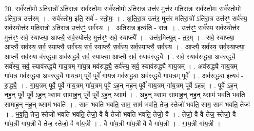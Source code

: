 \documentclass[17pt]{extarticle}
\begin{document}
20. सर्व॑स्तोमो ऽतिरा॒त्रो॑ ऽतिरा॒त्रः सर्व॑स्तोमः॒ सर्व॑स्तोमो ऽतिरा॒त्र उत्त॑र॒ मुत्त॑र मतिरा॒त्रः सर्व॑स्तोमः॒ सर्व॑स्तोमो ऽतिरा॒त्र उत्त॑रम् । . सर्व॑स्तोम॒ इति॒ सर्व॑ - स्तो॒मः॒ । . अ॒ति॒रा॒त्र उत्त॑र॒ मुत्त॑र मतिरा॒त्रो॑ ऽतिरा॒त्र उत्त॑रꣳ॒॒ सर्व॑स्य॒ सर्व॒स्योत्त॑र मतिरा॒त्रो॑ ऽतिरा॒त्र उत्त॑रꣳ॒॒ सर्व॑स्य । . अ॒ति॒रा॒त्र इत्य॑ति - रा॒त्रः । . उत्त॑रꣳ॒॒ सर्व॑स्य॒ सर्व॒स्योत्त॑र॒ मुत्त॑रꣳ॒॒ सर्व॒ स्याप्त्या॒ आप्त्यै॒ सर्व॒स्योत्त॑र॒ मुत्त॑रꣳ॒॒ सर्व॒ स्याप्त्यै᳚ । . उत्त॑र॒मित्युत् - त॒र॒म् । . सर्व॒ स्याप्त्या॒ आप्त्यै॒ सर्व॑स्य॒ सर्व॒ स्याप्त्यै॒ सर्व॑स्य॒ सर्व॒ स्याप्त्यै॒ सर्व॑स्य॒ सर्व॒स्याप्त्यै॒ सर्व॑स्य । . आप्त्यै॒ सर्व॑स्य॒ सर्व॒स्याप्त्या॒ आप्त्यै॒ सर्व॒स्या व॑रुद्ध्या॒ अव॑रुद्ध्यै॒ सर्व॒ स्याप्त्या॒ आप्त्यै॒ सर्व॒ स्याव॑रुद्ध्यै । . सर्व॒ स्याव॑रुद्ध्या॒ अव॑रुद्ध्यै॒ सर्व॑स्य॒ सर्व॒ स्याव॑रुद्ध्यै गाय॒त्रम् गा॑य॒त्र मव॑रुद्ध्यै॒ सर्व॑स्य॒ सर्व॒ स्याव॑रुद्ध्यै गाय॒त्रम् । . अव॑रुद्ध्यै गाय॒त्रम् गा॑य॒त्र मव॑रुद्ध्या॒ अव॑रुद्ध्यै गाय॒त्रम् पूर्वे॒ पूर्वे॑ गाय॒त्र मव॑रुद्ध्या॒ अव॑रुद्ध्यै गाय॒त्रम् पूर्वे᳚ । . अव॑रुद्ध्या॒ इत्यव॑ - रु॒द्ध्यै॒ । . गा॒य॒त्रम् पूर्वे॒ पूर्वे॑ गाय॒त्रम् गा॑य॒त्रम् पूर्वे ऽह॒न् नह॒न् पूर्वे॑ गाय॒त्रम् गा॑य॒त्रम् पूर्वे ऽहन्न्॑ । . पूर्वे ऽह॒न् नह॒न् पूर्वे॒ पूर्वे ऽह॒न् थ्साम॒ सामाह॒न् पूर्वे॒ पूर्वे ऽह॒न् थ्साम॑ । . अह॒न् थ्साम॒ सामाह॒न् नह॒न् थ्साम॑ भवति भवति॒ सामाह॒न् नह॒न् थ्साम॑ भवति । . साम॑ भवति भवति॒ साम॒ साम॑ भवति॒ तेज॒ स्तेजो॑ भवति॒ साम॒ साम॑ भवति॒ तेजः॑ । . भ॒व॒ति॒ तेज॒ स्तेजो॑ भवति भवति॒ तेजो॒ वै वै तेजो॑ भवति भवति॒ तेजो॒ वै । . तेजो॒ वै वै तेज॒ स्तेजो॒ वै गा॑य॒त्री गा॑य॒त्री वै तेज॒ स्तेजो॒ वै गा॑य॒त्री । . वै गा॑य॒त्री गा॑य॒त्री वै वै गा॑य॒त्री । . गा॒य॒त्री गा॑य॒त्री । \newline
\end{document}
